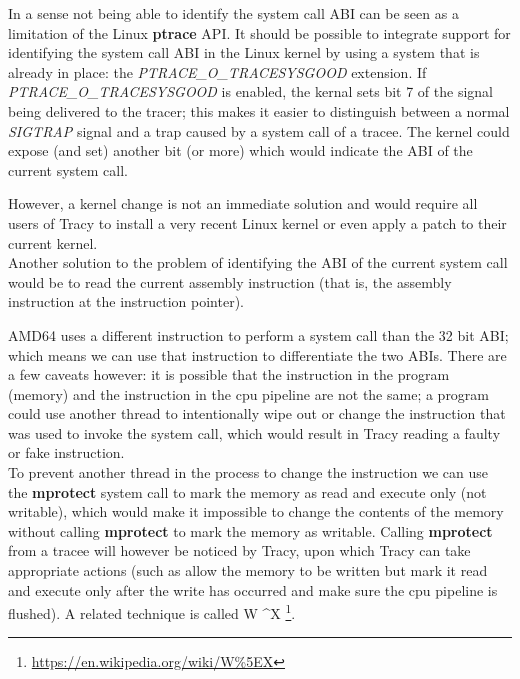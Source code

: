 \documentclass[a4paper, 10pt]{report}
\begin{document}
In a sense not being able to identify the system call ABI can be seen as a
limitation of the Linux \textbf{ptrace} API. It should be possible to
integrate support for identifying the system call ABI in the Linux kernel
by using a system that is already in place: the \textit{PTRACE\_O\_TRACESYSGOOD}
extension. If \textit{PTRACE\_O\_TRACESYSGOOD} is enabled, the kernal sets bit 7
of the signal being delivered to the tracer; this makes it easier to distinguish
between a normal \textit{SIGTRAP} signal and a trap caused by a system call of
a tracee. The kernel could expose (and set) another bit (or more) which would
indicate the ABI of the current system call.

However, a kernel change is not an immediate solution and would require all
users of Tracy to install a very recent Linux kernel or even apply a patch
to their current kernel. \\

Another solution to the problem of identifying the ABI of the current
system call would be to read the current assembly instruction (that is,
the assembly instruction at the instruction pointer).

AMD64 uses a
different instruction to perform a system call than the 32 bit ABI; which
means we can use that instruction to differentiate the two ABIs. There are a
few caveats however: it is possible that the instruction in the program (memory)
and the instruction in the cpu pipeline are not the same; a program could use
another thread to intentionally wipe out or change the instruction that was
used to invoke the system call, which would result in Tracy reading a faulty
or fake instruction. \\

To prevent another thread in the process to change the instruction we can
use the \textbf{mprotect} system call to mark the memory as read and execute
only (not writable), which would make it impossible to change the contents of
the memory without calling \textbf{mprotect} to mark the memory as writable.
Calling \textbf{mprotect} from a tracee will however be noticed by Tracy,
upon which Tracy can take appropriate actions (such as allow the memory to be
written but mark it read and execute only after the write has occurred and make
sure the cpu pipeline is flushed). A related technique is called
W \textasciicircum X \footnote{\url{https://en.wikipedia.org/wiki/W\%5EX}}.
\end{document}
